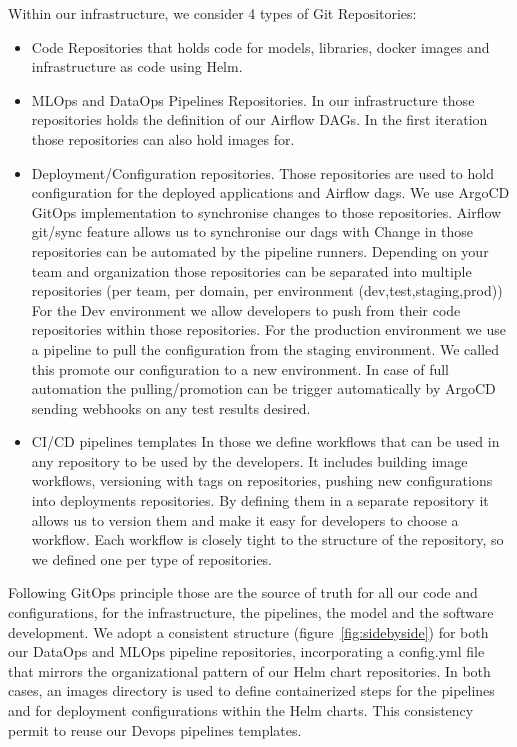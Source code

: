Within our infrastructure, we consider 4 types of Git Repositories:

\begin{itemize}
    \item Code Repositories that holds code for models, libraries, docker images and infrastructure as code using Helm.
    \item MLOps and DataOps Pipelines Repositories.
    In our infrastructure those repositories holds the definition of our Airflow DAGs.
    In the first iteration those repositories can also hold images for.


    \item Deployment/Configuration repositories.
    Those repositories are used to hold configuration for the deployed applications and Airflow dags.
    We use ArgoCD GitOps implementation to synchronise changes to those repositories.
    Airflow git/sync feature allows us to synchronise our dags with
    Change in those repositories can be automated by the pipeline runners.
    Depending on your team and organization those repositories can be separated into multiple repositories (per team, per domain, per environment (dev,test,staging,prod))
    For the Dev environment we allow developers to push from their code repositories within those repositories.
    For the production environment we use a pipeline to pull the configuration from the staging environment.
    We called this promote our configuration to a new environment.
    In case of full automation the pulling/promotion can be trigger automatically by ArgoCD sending webhooks on any test results desired.
    \item CI/CD pipelines templates
    In those we define workflows that can be used in any repository to be used by the developers.
    It includes building image workflows, versioning with tags on repositories, pushing new configurations into deployments repositories.
    By defining them in a separate repository it allows us to version them and make it easy for developers to choose a workflow.
    Each workflow is closely tight to the structure of the repository, so we defined one per type of repositories.
\end{itemize}

Following GitOps principle those are the source of truth for all our code and configurations, for the infrastructure, the pipelines, the model and the software development.
We adopt a consistent structure (figure~\ref{fig:sidebyside}) for both our DataOps and MLOps pipeline repositories, incorporating a config.yml file that mirrors the organizational pattern of our Helm chart repositories.
In both cases, an images directory is used to define containerized steps for the pipelines and for deployment configurations within the Helm charts.
This consistency permit to reuse our Devops pipelines templates.

